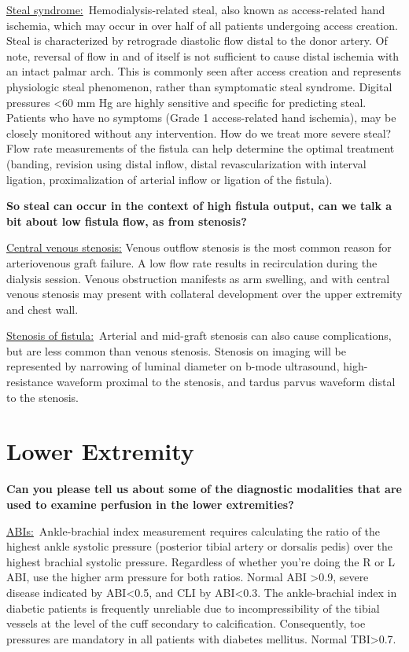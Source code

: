 \documentclass[
]{book}
\begin{document}
\underline{Steal syndrome:}~Hemodialysis-related steal, also known as
access-related hand ischemia, which may occur in over half of all
patients undergoing access creation. Steal is characterized by
retrograde diastolic flow distal to the donor artery. Of note, reversal
of flow in and of itself is not sufficient to cause distal ischemia with
an intact palmar arch. This is commonly seen after access creation and
represents physiologic steal phenomenon, rather than symptomatic steal
syndrome. Digital pressures \textless60 mm Hg are highly sensitive and specific
for predicting steal. Patients who have no symptoms (Grade 1
access-related hand ischemia), may be closely monitored without any
intervention. How do we treat more severe steal? Flow rate measurements
of the fistula can help determine the optimal treatment (banding,
revision using distal inflow, distal revascularization with interval
ligation, proximalization of arterial inflow or ligation of the
fistula).

\textbf{So steal can occur in the context of high fistula output, can we talk
a bit about low fistula flow, as from stenosis?}

\underline{Central venous stenosis:} Venous outflow stenosis is the most
common reason for arteriovenous graft failure. A low flow rate results
in recirculation during the dialysis session. Venous obstruction
manifests as arm swelling, and with central venous stenosis may present
with collateral development over the upper extremity and chest wall.

\underline{Stenosis of fistula:}~Arterial and mid-graft stenosis can also
cause complications, but are less common than venous stenosis. Stenosis
on imaging will be represented by narrowing of luminal diameter on
b-mode ultrasound, high-resistance waveform proximal to the stenosis,
and tardus parvus waveform distal to the stenosis.

\hypertarget{lower-extremity}{%
\section{Lower Extremity}\label{lower-extremity}}

\textbf{Can you please tell us about some of the diagnostic modalities that
are used to examine perfusion in the lower extremities?}

\underline{ABIs:}~Ankle-brachial index measurement requires calculating the
ratio of the highest ankle systolic pressure (posterior tibial artery or
dorsalis pedis) over the highest brachial systolic pressure. Regardless
of whether you're doing the R or L ABI, use the higher arm pressure for
both ratios. Normal ABI \textgreater0.9, severe disease indicated by ABI\textless0.5, and
CLI by ABI\textless0.3. The ankle-brachial index in diabetic patients is
frequently unreliable due to incompressibility of the tibial vessels at
the level of the cuff secondary to calcification. Consequently, toe
pressures are mandatory in all patients with diabetes mellitus. Normal
TBI\textgreater0.7.
\end{document}
